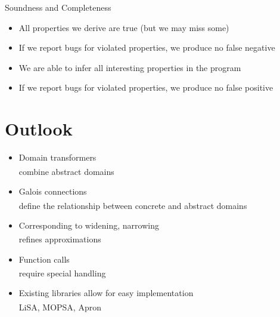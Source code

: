 \documentclass[
   aspectratio=169, %
   10pt, %
   uniqueslidenumber,
   professionalfonts
]{beamer}
\begin{document}
\begin{frame}{Soundness and Completeness}
   \vspace*{-2mm}
   \begin{itemize}
      \item<3-> All properties we derive are true (but we may miss some)
      \item<4-> If we report bugs for violated properties, we produce no false negative
   \end{itemize}
   \bigskip

   \vspace*{-2mm}
   \begin{itemize}
      \item<6-> We are able to infer all interesting properties in the program
      \item<7-> If we report bugs for violated properties, we produce no false positive
   \end{itemize}
   \begin{center}
   \end{center}
\end{frame}


\section{Outlook}
\begin{frame}{\insertsection}
   \begin{itemize}[<+(1)->]
      \itemsep8pt
      \item Domain transformers\\
         \color{gray}combine abstract domains\textsuperscript{\cite[149]{DBLP:journals/ftpl/Mine17}}
      \item Galois connections\\
         \color{gray}define the relationship between concrete and abstract domains\textsuperscript{\cite[110]{cousout2021principles}}
      \item Corresponding to widening, narrowing\\
      \color{gray}refines approximations\textsuperscript{\cite[395]{cousout2021principles}}
      \item Function calls\\
      \color{gray}require special handling\textsuperscript{\cite{DBLP:journals/iandc/MidtgaardJ12}}
      \item Existing libraries allow for easy implementation\\
      \color{gray}LiSA\textsuperscript{\cite{DBLP:conf/pldi/FerraraNAC21}}, MOPSA\textsuperscript{\cite{DBLP:conf/vstte/JournaultMMO19}}, Apron\textsuperscript{\cite{DBLP:conf/cav/JeannetM09}}
   \end{itemize}
\end{frame}
\end{document}
